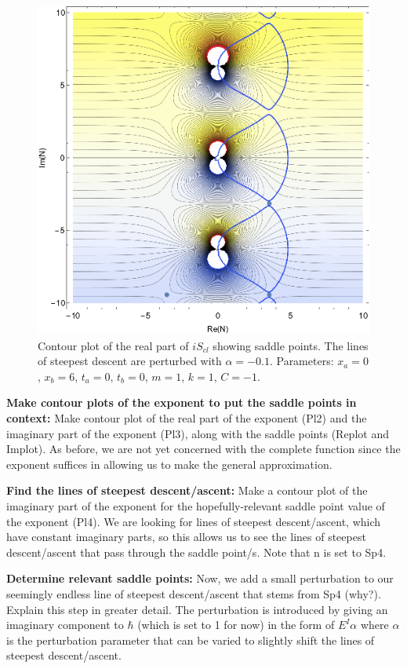 \documentclass[12pt]{revtex4}
\begin{document}
\begin{figure}[h]
	\centering
	\includegraphics[width=0.7\linewidth]{pperturb}
	\caption{Contour plot of the real part of $i S_{cl}$ showing saddle points. The lines of steepest descent are perturbed with $\alpha = -0.1$. Parameters: $x_a=0$, $x_b=6$, $t_a=0$, $t_b=0$, $m=1$, $k=1$, $C=-1$.}
	\label{fig:pperturb}
\end{figure}

\textbf{Make contour plots of the exponent to put the saddle points in context:}
Make contour plot of the real part of the exponent (Pl2) and the imaginary part of the exponent (Pl3), along with the saddle points (Replot and Implot). As before, we are not yet concerned with the complete function since the exponent suffices in allowing us to make the general approximation.

\textbf{Find the lines of steepest descent/ascent:}
Make a contour plot of the imaginary part of the exponent for the hopefully-relevant saddle point value of the exponent (Pl4). We are looking for lines of steepest descent/ascent, which have constant imaginary parts, so this allows us to see the lines of steepest descent/ascent that pass through the saddle point/s. Note that n is set to Sp4.

\textbf{Determine relevant saddle points:}
Now, we add a small perturbation to our seemingly endless line of steepest descent/ascent that stems from Sp4 (why?). Explain this step in greater detail. The perturbation is introduced by giving an imaginary component to $\hbar$ (which is set to 1 for now) in the form of $E^I\alpha$ where $\alpha$ is the perturbation parameter that can be varied to slightly shift the lines of steepest descent/ascent.
\end{document}
